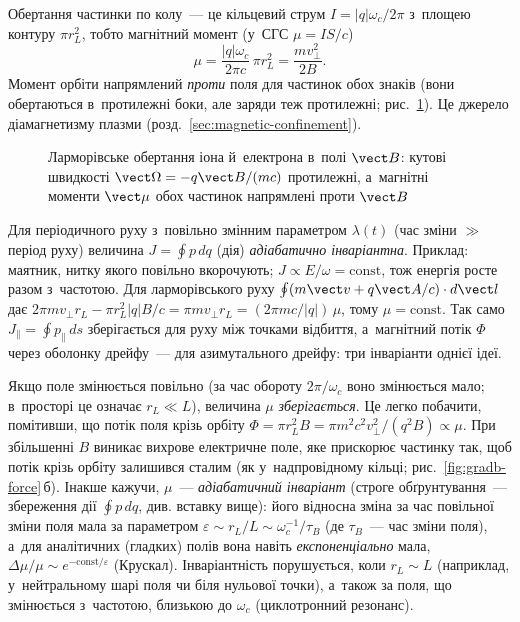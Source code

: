 Обертання частинки по колу~--- це кільцевий струм $I=|q|\omega_c/2\pi$ з~площею контуру
$\pi r_L^2$, тобто магнітний момент (у~СГС $\mu=IS/c$)
\begin{equation}\label{eq:mu}
	\mu=\frac{|q|\omega_c}{2\pi c}\,\pi r_L^2=\frac{mv_\perp^2}{2B}.
\end{equation}
Момент орбіти напрямлений \emph{проти} поля для частинок обох знаків (вони обертаються
в~протилежні боки, але заряди теж протилежні; рис.~\ref{fig:magnetic-moment}). Це джерело
діамагнетизму плазми (розд.~\ref{sec:magnetic-confinement}).

\begin{figure}[ht]\centering
	\caption{Ларморівське обертання іона й~електрона в~полі $\vect B$: кутові швидкості
	$\vect\Omega=-q\vect B/(mc)$ протилежні, а~магнітні моменти $\vect\mu$ обох частинок
	напрямлені проти $\vect B$}
	\label{fig:magnetic-moment}
\end{figure}

\begin{Theory}
Для періодичного руху з~повільно змінним параметром $\lambda(t)$ (час зміни $\gg$ період руху)
величина $J=\oint p\,dq$ (дія) \emph{адіабатично інваріантна}. Приклад: маятник, нитку якого повільно
вкорочують; $J\propto E/\omega=\mathrm{const}$, тож енергія росте разом з~частотою. Для ларморівського
руху $\oint(m\vect v+q\vect A/c)\cdot d\vect l$ дає $2\pi mv_\perp r_L-\pi r_L^2|q|B/c=\pi mv_\perp r_L=(2\pi mc/|q|)\,\mu$,
тому $\mu=\mathrm{const}$. Так само $J_\parallel=\oint p_\parallel\,ds$ зберігається для руху між точками
відбиття, а~магнітний потік $\Phi$ через оболонку дрейфу~--- для азимутального дрейфу:
три інваріанти однієї ідеї.
\end{Theory}

Якщо поле змінюється повільно (за час обороту $2\pi/\omega_c$ воно змінюється мало;
в~просторі це означає $r_L\ll L$), величина $\mu$ \emph{зберігається}. Це легко побачити,
помітивши, що потік поля крізь орбіту $\Phi=\pi r_L^2B=\pi
m^2c^2v_\perp^2/(q^2B)\propto\mu$. При збільшенні $B$ виникає вихрове електричне поле, яке
прискорює частинку так, щоб потік крізь орбіту залишився сталим (як у~надпровідному
кільці; рис.~\ref{fig:gradb-force}\,б). Інакше кажучи, $\mu$~--- \emph{адіабатичний інваріант}
(строге обґрунтування~--- збереження дії $\oint p\,dq$, див. вставку вище): його відносна зміна за час
повільної зміни поля мала за параметром $\varepsilon\sim r_L/L\sim\omega_c^{-1}/\tau_B$
(де $\tau_B$~--- час зміни поля), а~для аналітичних (гладких) полів вона навіть
\emph{експоненціально} мала, $\Delta\mu/\mu\sim e^{-\mathrm{const}/\varepsilon}$ (Крускал).
Інваріантність порушується, коли $r_L\sim L$ (наприклад, у~нейтральному шарі поля чи
біля нульової точки), а~також за поля, що змінюється з~частотою, близькою до $\omega_c$
(циклотронний резонанс).

